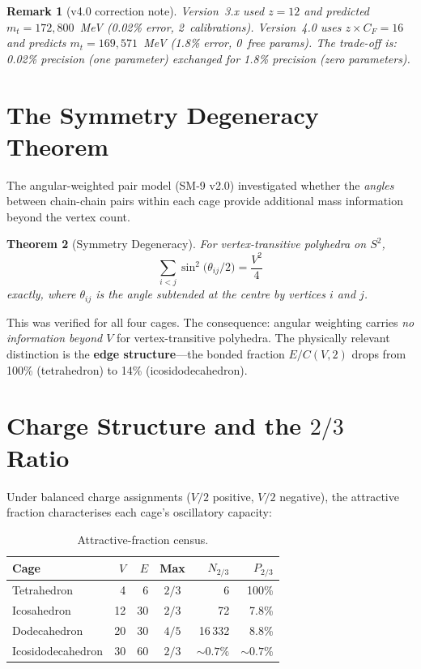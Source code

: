 \documentclass[11pt,letterpaper]{article}
\newtheorem{theorem}{Theorem}[section]
\newtheorem{remark}[theorem]{Remark}
\begin{document}
\begin{remark}[v4.0 correction note]
Version~3.x used $z = 12$ and predicted $m_t = 172{,}800$~MeV
(0.02\% error, 2~calibrations).  Version~4.0 uses $z \times C_F = 16$
and predicts $m_t = 169{,}571$~MeV (1.8\% error, 0~free params).
The trade-off is: 0.02\% precision (one parameter) exchanged for
1.8\% precision (zero parameters).
\end{remark}

\section{The Symmetry Degeneracy Theorem}
\label{sec:degeneracy}

The angular-weighted pair model (SM-9 v2.0) investigated whether
the \emph{angles} between chain-chain pairs within each cage
provide additional mass information beyond the vertex count.

\begin{theorem}[Symmetry Degeneracy]
\label{thm:degeneracy}
For vertex-transitive polyhedra on $S^2$,
\[
  \sum_{i<j} \sin^2\!\bigl(\theta_{ij}/2\bigr)
  = \frac{V^2}{4}
\]
exactly, where $\theta_{ij}$ is the angle subtended at the centre
by vertices $i$ and $j$.
\end{theorem}

This was verified for all four cages.  The consequence: angular
weighting carries \emph{no information beyond $V$} for
vertex-transitive polyhedra.  The physically relevant distinction
is the \textbf{edge structure}---the bonded fraction $E/C(V,2)$
drops from 100\% (tetrahedron) to 14\% (icosidodecahedron).

\section{Charge Structure and the $2/3$ Ratio}
\label{sec:charge}

Under balanced charge assignments ($V/2$ positive, $V/2$ negative),
the attractive fraction characterises each cage's oscillatory
capacity:

\begin{table}[H]
\centering
\caption{Attractive-fraction census.}
\label{tab:charge}
\begin{tabular}{@{}lrrcrr@{}}
\toprule
Cage & $V$ & $E$ & Max & $N_{2/3}$ & $P_{2/3}$ \\
\midrule
Tetrahedron       &  4 &  6 & $2/3$ &       6 & 100\% \\
Icosahedron       & 12 & 30 & $2/3$ &      72 &  7.8\% \\
Dodecahedron      & 20 & 30 & $4/5$ & 16\,332 &  8.8\% \\
Icosidodecahedron & 30 & 60 & $2/3$ & $\sim 0.7\%$ & $\sim 0.7\%$ \\
\bottomrule
\end{tabular}
\end{table}
\end{document}

